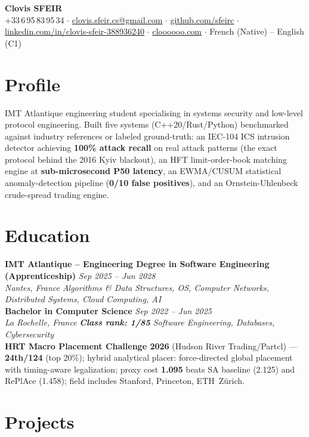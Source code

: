 \documentclass[10pt]{article}
\newcommand{\entry}[4]{%
  \noindent\textbf{#1} \hfill \textit{#2} \\
  \textit{#3} \hfill \textit{#4}\\[-0.3em]
}
\begin{document}
\fontsize{9.3pt}{11pt}\selectfont
\begin{center}
  {\LARGE \textbf{Clovis SFEIR}}\\[0.3em]
  +33\,6\,95\,83\,95\,34 \;$\cdot$\; \href{mailto:clovis.sfeir.cs@gmail.com}{clovis.sfeir.cs@gmail.com} \;$\cdot$\;
  \href{https://github.com/sfeirc}{github.com/sfeirc} \;$\cdot$\;
  \href{https://linkedin.com/in/clovis-sfeir-388936240}{linkedin.com/in/clovis-sfeir-388936240} \;$\cdot$\;
  \href{https://cloooooo.com}{cloooooo.com} \;$\cdot$\; French (Native) -- English (C1)
\end{center}

\section*{Profile}
IMT Atlantique engineering student specialising in systems security and low-level protocol engineering. Built five systems (C++20/Rust/Python) benchmarked against industry references or labeled ground-truth: an IEC-104 ICS intrusion detector achieving \textbf{100\% attack recall} on real attack patterns (the exact protocol behind the 2016 Kyiv blackout), an HFT limit-order-book matching engine at \textbf{sub-microsecond P50 latency}, an EWMA/CUSUM statistical anomaly-detection pipeline (\textbf{0/10 false positives}), and an Ornstein-Uhlenbeck crude-spread trading engine.

\section*{Education}
\entry{IMT Atlantique -- Engineering Degree in Software Engineering (Apprenticeship)}{Sep 2025 -- Jun 2028}{Nantes, France}{Algorithms \& Data Structures, OS, Computer Networks, Distributed Systems, Cloud Computing, AI}
\entry{Bachelor in Computer Science}{Sep 2022 -- Jun 2025}{La Rochelle, France}{\textbf{Class rank: 1/85} \textbar{} Software Engineering, Databases, Cybersecurity}
\noindent\textbf{HRT Macro Placement Challenge 2026} (Hudson River Trading/Partcl) --- \textbf{24th/124} (top 20\%); hybrid analytical placer: force-directed global placement with timing-aware legalization; proxy cost \textbf{1.095} beats SA baseline (2.125) and RePlAce (1.458); field includes Stanford, Princeton, ETH~Z\"urich.

\section*{Projects}
\end{document}
